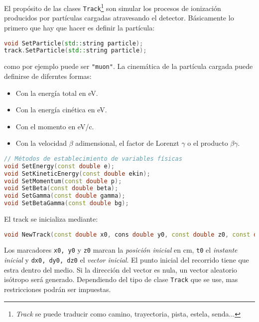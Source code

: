 El propósito de las clases \texttt{Track}\footnote{\textit{Track} se puede traducir como camino, trayectoria, pista, estela, senda...} son simular los procesos de ionización producidos por partículas cargadas atravesando el detector. Básicamente lo primero que hay que hacer es definir la partícula: \\

\begin{lstlisting}[language=C++,style=c++]
void SetParticle(std::string particle);
track.SetParticle(std::string particle);
\end{lstlisting}
\vspace*{0.7em}
como por ejemplo puede ser  \texttt{"muon"}. La cinemática de la partícula cargada puede definirse de diferntes formas:

\begin{itemize}
    \item Con la energía total en eV.
    \item Con la energía cinética en eV.
    \item Con el momento en eV/c.
    \item Con la velocidad $\beta$ adimensional, el factor de Lorenzt $\gamma$ o el producto $\beta\gamma$. 
\end{itemize}

\begin{lstlisting}[language=C++,style=c++]
// Métodos de establecimiento de variables físicas
void SetEnergy(const double e);
void SetKineticEnergy(const double ekin);
void SetMomentum(const double p);
void SetBeta(const double beta);
void SetGamma(const double gamma);
void SetBetaGamma(const double bg);
\end{lstlisting}
\vspace*{0.7em}
El track se inicializa mediante:   \\ 
\begin{lstlisting}[language=C++,style=c++]
void NewTrack(const double x0, cons double y0, const double z0, const double t0, const double dx0, const double dy0, const double dz0)
\end{lstlisting}
\vspace*{0.7em}
Los marcadores \texttt{x0, y0} y \texttt{z0} marcan la \textit{posición inicial} en cm, \texttt{t0} el \textit{instante inicial} y \texttt{dx0, dy0, dz0} el \textit{vector inicial}. El punto inicial del recorrido tiene que estra dentro del medio. Si la dirección del vector es nula, un vector aleatorio isótropo será generado. Dependiendo del tipo de clase \texttt{Track} que se use, mas restricciones podrán ser impuestas. 

